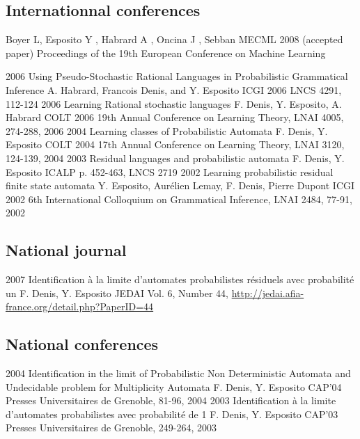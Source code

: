 \subsection*{Internationnal conferences}

{Boyer L, Esposito Y , Habrard A , Oncina J , Sebban M}{ECML 2008}
{(accepted paper) Proceedings of the 19th European Conference on Machine Learning}

\article
{2006} %
{Using Pseudo-Stochastic Rational Languages in Probabilistic Grammatical Inference} %
{A. Habrard, Francois Denis, and Y. Esposito} %
{ICGI 2006} %
{LNCS 4291, 112-124} %
\article
{2006}
{Learning Rational stochastic languages}
{F. Denis, Y. Esposito, A. Habrard}
{COLT 2006}
{19th Annual Conference on Learning Theory, LNAI 4005, 274-288, 2006}
\article
{2004}
{Learning classes of Probabilistic Automata}
{F. Denis, Y. Esposito}
{COLT 2004}
{17th Annual Conference on Learning Theory, LNAI 3120, 124-139, 2004}
\article
{2003}
{Residual languages and probabilistic automata}
{F. Denis, Y. Esposito}
{ICALP}
{p. 452-463, LNCS 2719}
\article
{2002}
{Learning probabilistic residual finite state automata}
{Y. Esposito, Aurélien Lemay, F. Denis, Pierre Dupont}
{ICGI 2002}
{6th International Colloquium on Grammatical Inference,  LNAI 2484, 77-91, 2002}

\subsection*{National journal}

\article
{2007}
{Identification à la limite d'automates probabilistes résiduels avec probabilité un}
{F. Denis, Y. Esposito}
{JEDAI}
{Vol. 6, Number 44, \href{http://jedai.afia-france.org/detail.php?PaperID=44}{http://jedai.afia-france.org/detail.php?PaperID=44}}

\subsection*{National conferences}

\article
{2004}
{Identification in the limit of Probabilistic Non Deterministic Automata and Undecidable problem for Multiplicity Automata}
{F. Denis, Y. Esposito}
{CAP'04}
{Presses Universitaires de Grenoble, 81-96, 2004}
\article
{2003}
{Identification à la limite d'automates probabilistes avec probabilité de 1}
{F. Denis, Y. Esposito}
{CAP'03}
{Presses Universitaires de Grenoble, 249-264, 2003}

